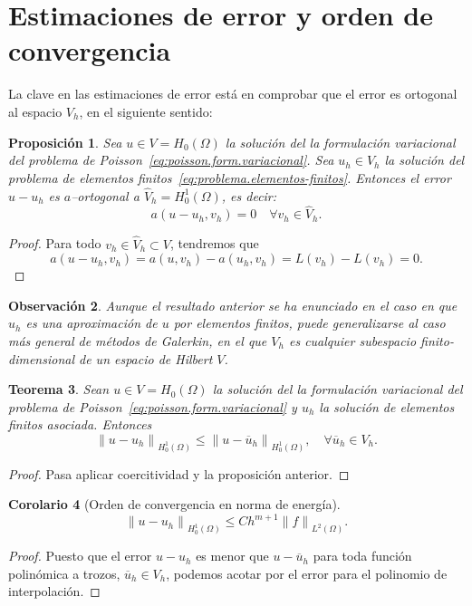 \documentclass[11pt]{report}
\theoremstyle{plain}
\newtheorem{theorem}{Teorema}[chapter]
\newtheorem{proposition}[theorem]{Proposición}
\newtheorem{corolary}[theorem]{Corolario}
\newtheorem{remark}[theorem]{Observación}
\theoremstyle{definition}
\newcommand{\norm}[1]{\ensuremath{\|#1\|}}
\begin{document}
\section{Estimaciones de error y orden de convergencia}

La clave en las estimaciones de error está en comprobar que el error es ortogonal al espacio $V_h$, en el siguiente sentido: 
\begin{proposition}
Sea $u\in V=H_0(\Omega)$ la solución del la formulación variacional del problema de Poisson~\eqref{eq:poisson.form.variacional}.
Sea $u_h\in V_h$ la solución del problema de elementos finitos~\eqref{eq:problema.elementos-finitos}. Entonces el error $u-u_h$ es $a$--ortogonal a $\widehat V_h = H_0^1(\Omega)$, es decir:
\[
  a(u-u_h, v_h) = 0 \quad \forall v_h\in \widehat V_h.
\]
\end{proposition}

\begin{proof}
 Para todo $v_h\in \widehat V_h \subset V$, tendremos que
 \[
   a(u-u_h,v_h)=a(u,v_h)-a(u_h,v_h)=L(v_h)-L(v_h)=0.
 \]
\end{proof}

\begin{remark}
Aunque el resultado anterior se ha enunciado en el caso en que $u_h$ es una aproximación de $u$ por elementos finitos, puede generalizarse al caso más general de métodos de Galerkin, en el que $V_h$ es cualquier subespacio finito-dimensional de un espacio de Hilbert $V$.
\end{remark}

\begin{theorem} 
  Sean $u\in V=H_0(\Omega)$ la solución del la formulación variacional del problema de Poisson~\eqref{eq:poisson.form.variacional} y $u_h$ la solución de elementos finitos asociada. Entonces
  $$
  \label{th:estimaciones.error}
  \norm{u-u_h}_{H_0^1(\Omega)} \leq \norm{u-\overline u_h}_{H_0^1(\Omega)}, \quad \forall \overline u_h\in V_h.
  $$
\end{theorem}

\begin{proof}
  Pasa aplicar coercitividad y la proposición anterior.
\end{proof}

\begin{corolary}[Orden de convergencia en norma de energía] 
  $$
  \norm{u-u_h}_{H_0^1(\Omega)} \leq C h^{m+1} \norm{f}_{L^2(\Omega)}.
  $$
\end{corolary}

\begin{proof}
  Puesto que el error $u-u_h$ es menor que $u-\overline u_h$ para toda función polinómica a trozos, $\overline u_h\in V_h$, podemos acotar por el error para el polinomio de interpolación.
\end{proof}


\end{document}
